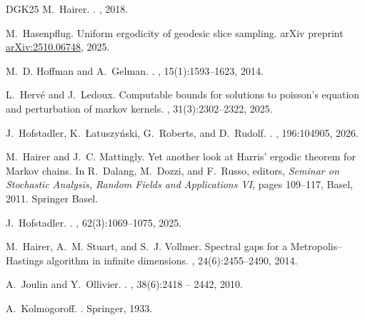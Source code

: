 \documentclass[12pt]{article}
\theoremstyle{plain}
\begin{document}
{\begin{thebibliography}{DGK{\etalchar{+}}25}
	M.~Hairer.
	.
	,
	2018.
	
	M.~Hasenpflug.
	\newblock Uniform ergodicity of geodesic slice sampling.
	\newblock arXiv preprint
	\href{https://arxiv.org/abs/2510.06748}{arXiv:2510.06748}, 2025.
	
	M.~D. Hoffman and A.~Gelman.
	.
	, 15(1):1593--1623, 2014.
	
	L.~Herv{\'e} and J.~Ledoux.
	\newblock Computable bounds for solutions to poisson’s equation and
	perturbation of markov kernels.
	, 31(3):2302--2322, 2025.
	
	J.~Hofstadler, K.~{\L}atuszy{\'n}ski, G.~Roberts, and D.~Rudolf.
	.
	, 196:104905, 2026.
	
	M.~Hairer and J.~C. Mattingly.
	\newblock Yet another look at {H}arris' ergodic theorem for {M}arkov {c}hains.
	\newblock In R.~Dalang, M.~Dozzi, and F.~Russo, editors, {\em Seminar on
		Stochastic Analysis, Random Fields and Applications VI}, pages 109--117,
	Basel, 2011. Springer Basel.
	
	J.~Hofstadler.
	.
	, 62(3):1069–1075, 2025.
	
	M.~Hairer, A.~M. Stuart, and S.~J. Vollmer.
	\newblock Spectral gaps for a {M}etropolis–{H}astings algorithm in infinite
	dimensions.
	, 24(6):2455--2490, 2014.
	
	A.~Joulin and Y.~Ollivier.
	.
	, 38(6):2418 -- 2442, 2010.
	
	A.~Kolmogoroff.
	.
	\newblock Springer, 1933.
	

\end{thebibliography}}
\end{document}
